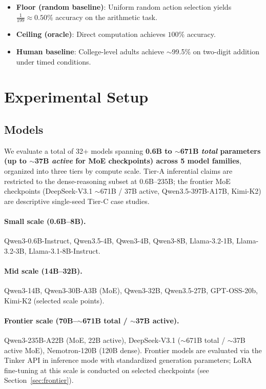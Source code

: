 \documentclass{article}
\begin{document}
\begin{itemize}
    \item \textbf{Floor (random baseline)}: Uniform random action selection yields
    $\frac{1}{199} \approx 0.50\%$ accuracy on the arithmetic task.
    \item \textbf{Ceiling (oracle)}: Direct computation achieves $100\%$ accuracy.
    \item \textbf{Human baseline}: College-level adults achieve $\sim$99.5\% on
    two-digit addition under timed conditions.
\end{itemize}

\section{Experimental Setup}
\label{sec:setup}

\subsection{Models}

We evaluate a total of 32+ models spanning \textbf{0.6B to
$\sim$671B \emph{total} parameters (up to $\sim$37B \emph{active}
for MoE checkpoints) across 5 model families}, organized into three
tiers by compute scale. Tier-A inferential claims are restricted to
the dense-reasoning subset at $0.6$B--$235$B; the frontier MoE
checkpoints (DeepSeek-V3.1 $\sim$671B / 37B active, Qwen3.5-397B-A17B,
Kimi-K2) are descriptive single-seed Tier-C case studies.

\paragraph{Small scale (0.6B--8B).}
Qwen3-0.6B-Instruct, Qwen3.5-4B, Qwen3-4B, Qwen3-8B,
Llama-3.2-1B, Llama-3.2-3B, Llama-3.1-8B-Instruct.

\paragraph{Mid scale (14B--32B).}
Qwen3-14B, Qwen3-30B-A3B (MoE), Qwen3-32B, Qwen3.5-27B,
GPT-OSS-20b, Kimi-K2 (selected scale points).

\paragraph{Frontier scale (70B--$\sim$671B total / $\sim$37B active).}
Qwen3-235B-A22B (MoE, 22B active), DeepSeek-V3.1 ($\sim$671B total /
$\sim$37B active MoE), Nemotron-120B (120B dense).
Frontier models are evaluated via the Tinker API in inference mode
with standardized generation parameters; LoRA fine-tuning at this
scale is conducted on selected checkpoints (see Section~\ref{sec:frontier}).
\end{document}
